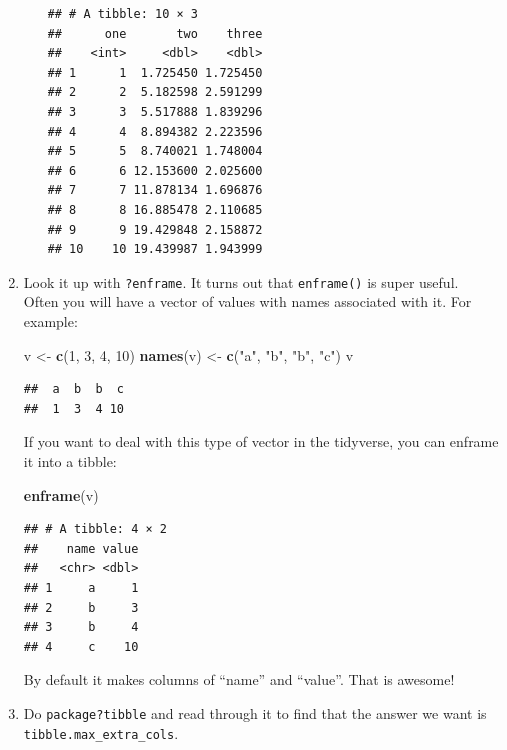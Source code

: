 \documentclass[]{book}
\newenvironment{Shaded}{\begin{snugshade}}{\end{snugshade}}
\newcommand{\KeywordTok}[1]{\textcolor[rgb]{0.13,0.29,0.53}{\textbf{{#1}}}}
\newcommand{\DecValTok}[1]{\textcolor[rgb]{0.00,0.00,0.81}{{#1}}}
\newcommand{\StringTok}[1]{\textcolor[rgb]{0.31,0.60,0.02}{{#1}}}
\newcommand{\NormalTok}[1]{{#1}}
\theoremstyle{definition}
\theoremstyle{definition}
\theoremstyle{remark}
\begin{document}
\begin{enumerate}
\begin{enumerate}
\begin{verbatim}
## # A tibble: 10 × 3
##      one       two    three
##    <int>     <dbl>    <dbl>
## 1      1  1.725450 1.725450
## 2      2  5.182598 2.591299
## 3      3  5.517888 1.839296
## 4      4  8.894382 2.223596
## 5      5  8.740021 1.748004
## 6      6 12.153600 2.025600
## 7      7 11.878134 1.696876
## 8      8 16.885478 2.110685
## 9      9 19.429848 2.158872
## 10    10 19.439987 1.943999
\end{verbatim}
  \end{enumerate}
\item
  Look it up with \texttt{?enframe}. It turns out that
  \texttt{enframe()} is super useful.\\
  Often you will have a vector of values with names associated with it.
  For example:

\begin{Shaded}
\begin{Highlighting}[]
\NormalTok{v <-}\StringTok{ }\KeywordTok{c}\NormalTok{(}\DecValTok{1}\NormalTok{, }\DecValTok{3}\NormalTok{, }\DecValTok{4}\NormalTok{, }\DecValTok{10}\NormalTok{)}
\KeywordTok{names}\NormalTok{(v) <-}\StringTok{ }\KeywordTok{c}\NormalTok{(}\StringTok{"a"}\NormalTok{, }\StringTok{"b"}\NormalTok{, }\StringTok{"b"}\NormalTok{, }\StringTok{"c"}\NormalTok{)}
\NormalTok{v}
\end{Highlighting}
\end{Shaded}

\begin{verbatim}
##  a  b  b  c 
##  1  3  4 10
\end{verbatim}

  If you want to deal with this type of vector in the tidyverse, you can
  enframe it into a tibble:

\begin{Shaded}
\begin{Highlighting}[]
\KeywordTok{enframe}\NormalTok{(v)}
\end{Highlighting}
\end{Shaded}

\begin{verbatim}
## # A tibble: 4 × 2
##    name value
##   <chr> <dbl>
## 1     a     1
## 2     b     3
## 3     b     4
## 4     c    10
\end{verbatim}

  By default it makes columns of ``name'' and ``value''. That is
  awesome!
\item
  Do \texttt{package?tibble} and read through it to find that the answer
  we want is \texttt{tibble.max\_extra\_cols}.
\end{enumerate}
\end{document}
